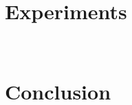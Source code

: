 \documentclass{llncs}
\begin{document}
\vspace{-1em}
\section{Experiments}~\label{sec:exp}

\vspace{-0.5em}

\section{Conclusion}~\label{sec:conclusion}


\newpage
%



\appendix

\end{document}
